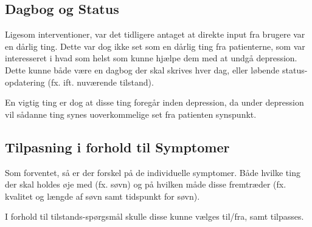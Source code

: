 \subsection{Dagbog og Status}
Ligesom interventioner, var det tidligere antaget at direkte input fra brugere var en dårlig ting.
Dette var dog ikke set som en dårlig ting fra patienterne, som var interesseret i hvad som helst som kunne hjælpe dem med at undgå depression.
Dette kunne både være en dagbog der skal skrives hver dag, eller løbende status-opdatering (fx. ift. nuværende tilstand).

En vigtig ting er dog at disse ting foregår inden depression, da under depression vil sådanne ting synes uoverkommelige set fra patienten synspunkt.

\subsection{Tilpasning i forhold til Symptomer}
Som forventet, så er der forskel på de individuelle symptomer.
Både hvilke ting der skal holdes øje med (fx. søvn) og på hvilken måde disse fremtræder (fx. kvalitet og længde af søvn samt tidspunkt for søvn).

I forhold til tilstands-spørgsmål skulle disse kunne vælges til/fra, samt tilpasses.

